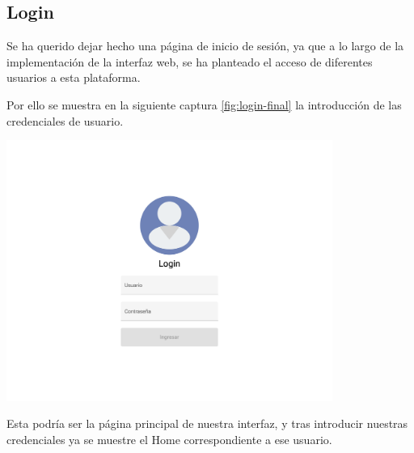 \newpage

\subsection{Login}

Se ha querido dejar hecho una página de inicio de sesión, ya que a lo largo de la implementación de la interfaz web, se ha planteado el acceso de diferentes usuarios a esta plataforma.

Por ello se muestra en la siguiente captura \ref{fig:login-final} la introducción de las credenciales de usuario.

\begin{center}
    \centering
    \includegraphics[width=0.8\textwidth]{img/06-Web-login.png}
    \label{fig:login-final}
\end{center}

Esta podría ser la página principal de nuestra interfaz, y tras introducir nuestras credenciales ya se muestre el Home correspondiente a ese usuario.